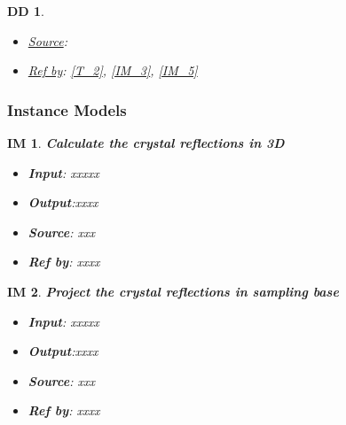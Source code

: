 \documentclass[12pt]{article}
\newtheorem{DD}{DD}
\newtheorem{IM}{IM}
\begin{document}
\begin{DD}
\begin{itemize}
\begin{equation}
\label{eq:crystal_strain_Fourier_series}
\end{equation}
By applying GPA (\cref{T_2}) on \cref{eq:crystal_strain_Fourier_series}, 
$P_{g_{j}}(\vec{r})$ can be extracted. Then by applying \cref{A_4}, the gradient 
$\nabla$ of $P_{g_{j}}(\vec{r})$ can be approximate as follows
\begin{equation}
\nabla P_{g_{j}}(\vec{r}) = 2\pi [\nabla( \Delta 
\overrightarrow{g_j}\cdot\vec{r}  )] \approx 2\pi\Delta 
\overrightarrow{g_j(\vec{r})}
\label{eq:Strain_GPA}
\end{equation}
\item \underline{Source}: \cite{Hytch1998}
\item \underline{Ref by}: \cref{T_2}, \cref{IM_3}, \cref{IM_5}
\end{itemize}
\end{DD}

\subsubsection{Instance Models} \label{sec_instance}    

\renewcommand{\labelitemi}{$-$}

\begin{IM}
\label{IM_1}
\noindent\colorbox{shadecolorIM}{\normalfont \textbf{Calculate the crystal reflections in 3D}}
\normalfont
\begin{itemize}
\item \textbf{Input}: xxxxx
\item \textbf{Output}:xxxx

\item \textbf{Source}: xxx
\item \textbf{Ref by}: xxxx
\end{itemize}
\end{IM}

\begin{IM}
\label{IM_2}
\noindent\colorbox{shadecolorIM}{\normalfont \textbf{Project the crystal reflections in sampling base}}
\normalfont
\begin{itemize}
\item \textbf{Input}: xxxxx
\item \textbf{Output}:xxxx

\item \textbf{Source}: xxx
\item \textbf{Ref by}: xxxx
\end{itemize}
\end{IM}
\end{document}
